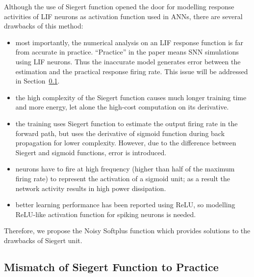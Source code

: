 \documentclass[runningheads,a4paper]{llncs}
\begin{document}
Although the use of Siegert function opened the door for modelling response activities of LIF neurons as activation function used in ANNs, there are several drawbacks of this method:
\begin{itemize}
	\item most importantly, the numerical analysis on an LIF response function is far from accurate in practice. ``Practice'' in the paper means SNN simulations using LIF neurons.
	Thus the inaccurate model generates error between the estimation and the practical response firing rate.
	This issue will be addressed in Section~\ref{subsec:practice}.
	
	
	\item the high complexity of the Siegert function causes much longer training time and more energy, let alone the high-cost computation on its derivative.
	\item the training uses Siegert function to estimate the output firing rate in the forward path, but uses the derivative of sigmoid function during back propagation for lower complexity.
	However, due to the difference between Siegert and sigmoid functions, error is introduced. 
	\item neurons have to fire at high frequency (higher than half of the maximum firing rate) to represent the activation of a sigmoid unit; as a result the network activity results in high power dissipation.
	\item better learning performance has been reported using ReLU, so modelling ReLU-like activation function for spiking neurons is needed.  
\end{itemize}

Therefore, we propose the Noisy Softplus function which provides solutions to the drawbacks of Siegert unit.

\subsection{Mismatch of Siegert Function to Practice }
\label{subsec:practice}
\end{document}

